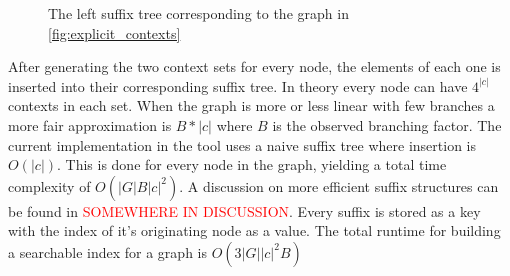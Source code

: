 \documentclass{article}
\begin{document}
\par\noindent
\begin{wrapfigure}{l}{0.49\textwidth}
	\begin{mdframed}
	\end{mdframed}
	\caption{The left suffix tree corresponding to the graph in \ref{fig:explicit_contexts}}
	\label{fig:left_suffix_tree}
\end{wrapfigure}
After generating the two context sets for every node, the elements of each one is inserted into their corresponding suffix tree. In theory every node can have $4^{|c|}$ contexts in each set. When the graph is more or less linear with few branches a more fair approximation is $B*|c|$ where $B$ is the observed branching factor. The current implementation in the tool uses a naive suffix tree where insertion is $O(|c|)$. This is done for every node in the graph, yielding a total time complexity of $O(|G|B|c|^2)$. A discussion on more efficient suffix structures can be found in \textcolor{red}{SOMEWHERE IN DISCUSSION}. Every suffix is stored as a key with the index of it's originating node as a value. The total runtime for building a searchable index for a graph is $O(3|G||c|^2B)$
\end{document}

